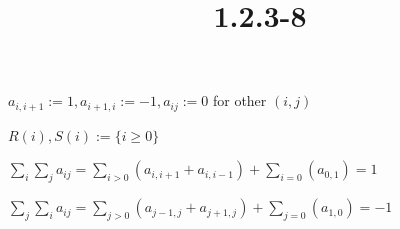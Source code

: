 \documentclass{article}
\title{1.2.3-8}
\begin{document}
\maketitle

$a_{i,i+1} := 1, a_{i+1,i} := -1, a_{ij} := 0$ for other $(i,j)$

$R(i), S(i) := \{ i \geq 0 \}$

$\sum_{i}\sum_{j} a_{ij} = \sum_{i>0}(a_{i,i+1} + a_{i,i-1}) + \sum_{i=0} (a_{0,1}) = 1$

$\sum_{j}\sum_{i} a_{ij} = \sum_{j>0}(a_{j-1,j} + a_{j+1,j}) + \sum_{j=0} (a_{1,0}) = -1$
\end{document}
